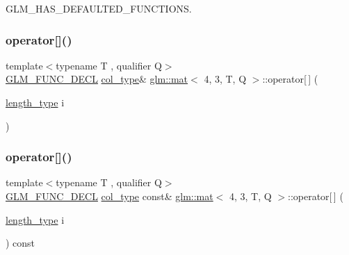 G\+L\+M\+\_\+\+H\+A\+S\+\_\+\+D\+E\+F\+A\+U\+L\+T\+E\+D\+\_\+\+F\+U\+N\+C\+T\+I\+O\+NS. 

\mbox{\label{structglm_1_1mat_3_014_00_013_00_01_t_00_01_q_01_4_a35ef287c1963b05945a5bb159ff3ac70}} 
\subsubsection{\texorpdfstring{operator[]()}{operator[]()}\hspace{0.1cm}{\footnotesize\ttfamily [1/2]}}
{\footnotesize\ttfamily template$<$typename T , qualifier Q$>$ \\
\mbox{\hyperlink{setup_8hpp_ab2d052de21a70539923e9bcbf6e83a51}{G\+L\+M\+\_\+\+F\+U\+N\+C\+\_\+\+D\+E\+CL}} \mbox{\hyperlink{structglm_1_1mat_3_014_00_013_00_01_t_00_01_q_01_4_ab7cb76d6290691108c8af724270e3b6c}{col\+\_\+type}}\& \mbox{\hyperlink{structglm_1_1mat}{glm\+::mat}}$<$ 4, 3, T, Q $>$\+::operator\mbox{[}$\,$\mbox{]} (\begin{DoxyParamCaption}\item[{\mbox{\hyperlink{structglm_1_1mat_3_014_00_013_00_01_t_00_01_q_01_4_a24f0f2085bebe0a6e79da267368e74f5}{length\+\_\+type}}}]{i }\end{DoxyParamCaption})}

\mbox{\label{structglm_1_1mat_3_014_00_013_00_01_t_00_01_q_01_4_aaad4f07304cb7a1d857251e6cb39063a}} 
\subsubsection{\texorpdfstring{operator[]()}{operator[]()}\hspace{0.1cm}{\footnotesize\ttfamily [2/2]}}
{\footnotesize\ttfamily template$<$typename T , qualifier Q$>$ \\
\mbox{\hyperlink{setup_8hpp_ab2d052de21a70539923e9bcbf6e83a51}{G\+L\+M\+\_\+\+F\+U\+N\+C\+\_\+\+D\+E\+CL}} \mbox{\hyperlink{structglm_1_1mat_3_014_00_013_00_01_t_00_01_q_01_4_ab7cb76d6290691108c8af724270e3b6c}{col\+\_\+type}} const\& \mbox{\hyperlink{structglm_1_1mat}{glm\+::mat}}$<$ 4, 3, T, Q $>$\+::operator\mbox{[}$\,$\mbox{]} (\begin{DoxyParamCaption}\item[{\mbox{\hyperlink{structglm_1_1mat_3_014_00_013_00_01_t_00_01_q_01_4_a24f0f2085bebe0a6e79da267368e74f5}{length\+\_\+type}}}]{i }\end{DoxyParamCaption}) const}



